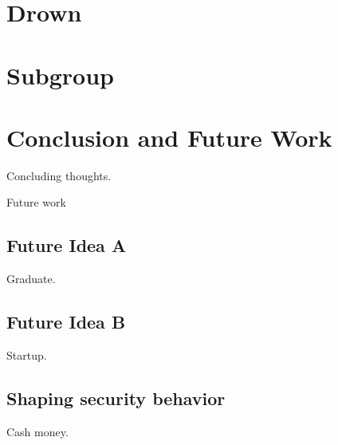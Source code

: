 \chapter{Drown}

\chapter{Subgroup}


\chapter{Conclusion and Future Work}

Concluding thoughts.

Future work

\section{Future Idea A}
Graduate.

\section{Future Idea B}
Startup.

\section{Shaping security behavior}
Cash money.





